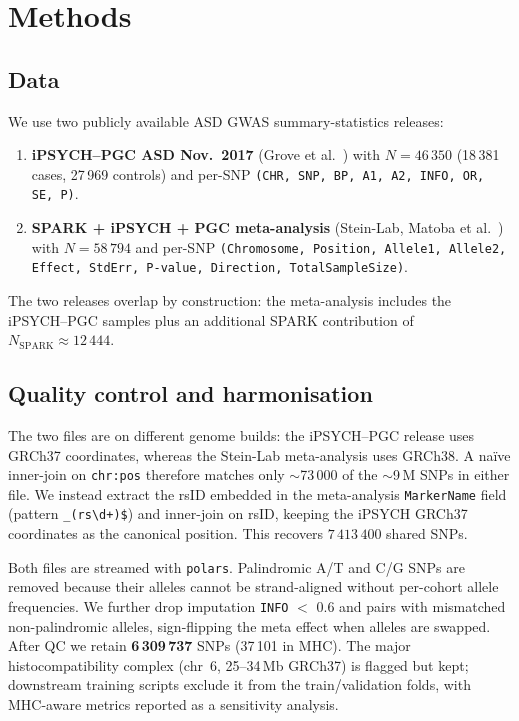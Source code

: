 \section{Methods}
\label{sec:methods}

\subsection{Data}

We use two publicly available ASD GWAS summary-statistics releases:
\begin{enumerate}[nosep,leftmargin=1.2em]
  \item \textbf{iPSYCH--PGC ASD Nov.~2017} (Grove et al.~\cite{grove2019})
        with $N = 46\,350$ (18\,381 cases, 27\,969 controls) and per-SNP
        \texttt{(CHR, SNP, BP, A1, A2, INFO, OR, SE, P)}.
  \item \textbf{SPARK + iPSYCH + PGC meta-analysis} (Stein-Lab,
        Matoba et al.~\cite{matoba2020}) with $N = 58\,794$ and
        per-SNP \texttt{(Chromosome, Position, Allele1, Allele2, Effect,
        StdErr, P-value, Direction, TotalSampleSize)}.
\end{enumerate}
The two releases overlap by construction: the meta-analysis includes the
iPSYCH--PGC samples plus an additional SPARK contribution of
$N_{\mathrm{SPARK}} \approx 12\,444$.

\subsection{Quality control and harmonisation}

The two files are on different genome builds: the iPSYCH--PGC release
uses GRCh37 coordinates, whereas the Stein-Lab meta-analysis uses
GRCh38. A na\"{i}ve inner-join on \texttt{chr:pos} therefore matches
only $\sim$73\,000 of the $\sim$9\,M SNPs in either file. We instead
extract the rsID embedded in the meta-analysis \texttt{MarkerName} field
(pattern \texttt{\_(rs\textbackslash d+)\$}) and inner-join on rsID,
keeping the iPSYCH GRCh37 coordinates as the canonical
position. This recovers $7\,413\,400$ shared SNPs.

Both files are streamed with \texttt{polars}. Palindromic A/T and C/G
SNPs are removed because their alleles cannot be strand-aligned without
per-cohort allele frequencies. We further drop imputation \texttt{INFO}
$<$ 0.6 and pairs with mismatched non-palindromic alleles, sign-flipping
the meta effect when alleles are swapped. After QC we retain
\textbf{6\,309\,737} SNPs (37\,101 in MHC). The major histocompatibility
complex (chr~6, 25--34\,Mb GRCh37) is flagged but kept; downstream
training scripts exclude it from the train/validation folds, with
MHC-aware metrics reported as a sensitivity analysis.

